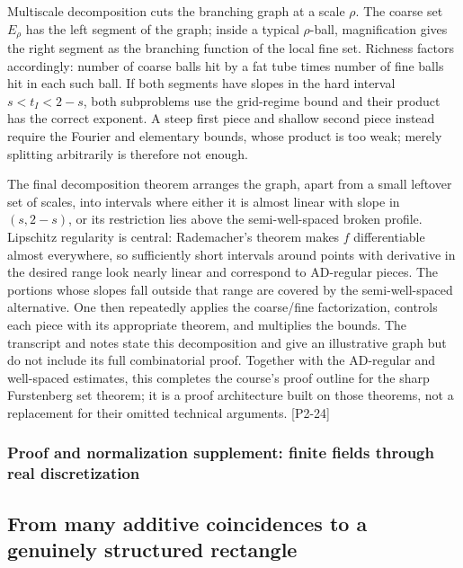 Multiscale decomposition cuts the branching graph at a scale \(\rho\). The coarse set \(E_\rho\) has the left segment of the graph; inside a typical \(\rho\)-ball, magnification gives the right segment as the branching function of the local fine set. Richness factors accordingly: number of coarse balls hit by a fat tube times number of fine balls hit in each such ball. If both segments have slopes in the hard interval \(s<t_I<2-s\), both subproblems use the grid-regime bound and their product has the correct exponent. A steep first piece and shallow second piece instead require the Fourier and elementary bounds, whose product is too weak; merely splitting arbitrarily is therefore not enough.

The final decomposition theorem arranges the graph, apart from a small leftover set of scales, into intervals where either it is almost linear with slope in \((s,2-s)\), or its restriction lies above the semi-well-spaced broken profile. Lipschitz regularity is central: Rademacher's theorem makes \(f\) differentiable almost everywhere, so sufficiently short intervals around points with derivative in the desired range look nearly linear and correspond to AD-regular pieces. The portions whose slopes fall outside that range are covered by the semi-well-spaced alternative. One then repeatedly applies the coarse/fine factorization, controls each piece with its appropriate theorem, and multiplies the bounds. The transcript and notes state this decomposition and give an illustrative graph but do not include its full combinatorial proof. Together with the AD-regular and well-spaced estimates, this completes the course's proof outline for the sharp Furstenberg set theorem; it is a proof architecture built on those theorems, not a replacement for their omitted technical arguments. {[}P2-24{]}

\subsubsection{Proof and normalization supplement: finite fields through real discretization}\label{04-visual-computing-ii-ch033-proof-and-normalization-supplement-finite-fields-through-real-discretization}

\subsection{From many additive coincidences to a genuinely structured rectangle}\label{04-visual-computing-ii-ch033-from-many-additive-coincidences-to-a-genuinely-structured-rectangle-1}

